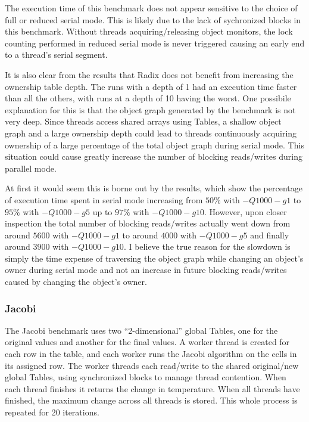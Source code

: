 The execution time of this benchmark does not appear sensitive to the
choice of full or reduced serial mode.  This is likely due to the lack
of sychronized blocks in this benchmark.  Without threads
acquiring/releasing object monitors, the lock counting performed in
reduced serial mode is never triggered causing an early end to a
thread's serial segment.

It is also clear from the results that Radix does not benefit from
increasing the ownership table depth.  The runs with a depth of 1 had
an execution time faster than all the others, with runs at a depth of
10 having the worst.  One possibile explanation for this is that the
object graph generated by the benchmark is not very deep.  Since
threads access shared arrays using Tables, a shallow object graph and
a large ownership depth could lead to threads continuously acquiring
ownership of a large percentage of the total object graph during
serial mode.  This situation could cause greatly increase the number
of blocking reads/writes during parallel mode.

At first it would seem this is borne out by the results, which show
the percentage of execution time spent in serial mode increasing from
$50\%$ with $-Q1000 -g1$ to $95\%$ with $-Q1000 -g5$ up to $97\%$ with
$-Q1000 -g10$.  However, upon closer inspection the total number of
blocking reads/writes actually went down from around $5600$ with
$-Q1000 -g1$ to around $4000$ with $-Q1000 -g5$ and finally around
$3900$ with $-Q1000 -g10$.  I believe the true reason for the slowdown
is simply the time expense of traversing the object graph while
changing an object's owner during serial mode and not an increase in
future blocking reads/writes caused by changing the object's owner.

\subsubsection{Jacobi}

The Jacobi benchmark uses two ``2-dimensional'' global Tables, one for
the original values and another for the final values.  A worker thread
is created for each row in the table, and each worker runs the Jacobi
algorithm on the cells in its assigned row.  The worker threads each
read/write to the shared original/new global Tables, using
synchronized blocks to manage thread contention.  When each thread
finishes it returns the change in temperature.  When all threads have
finished, the maximum change across all threads is stored.  This whole
process is repeated for 20 iterations.


